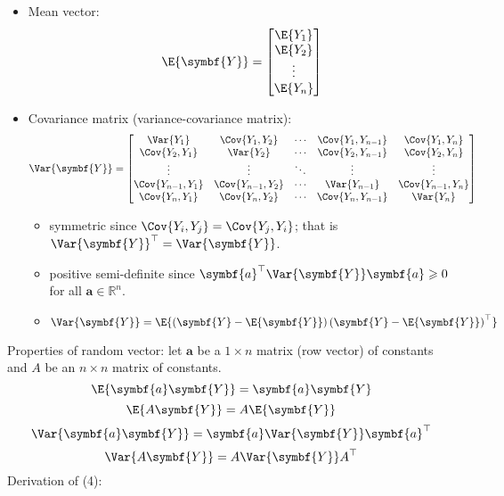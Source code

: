 \begin{itemize}
    \item Mean vector:
          \[ \E{\symbf{Y}}=\begin{bmatrix}
                  \E{Y_1} \\
                  \E{Y_2} \\
                  \vdots  \\
                  \E{Y_n}
              \end{bmatrix} \]
    \item Covariance matrix (variance-covariance matrix):
          \[ \Var{\symbf{Y}}=\begin{bmatrix}
                  \Var{Y_1}         & \Cov{Y_1,Y_2}     & \cdots & \Cov{Y_1,Y_{n-1}} & \Cov{Y_1,Y_n}     \\
                  \Cov{Y_2,Y_1}     & \Var{Y_2}         & \cdots & \Cov{Y_2,Y_{n-1}} & \Cov{Y_2,Y_n}     \\
                  \vdots            & \vdots            & \ddots & \vdots            & \vdots            \\
                  \Cov{Y_{n-1},Y_1} & \Cov{Y_{n-1},Y_2} & \cdots & \Var{Y_{n-1}}     & \Cov{Y_{n-1},Y_n} \\
                  \Cov{Y_n,Y_1}     & \Cov{Y_n,Y_2}     & \cdots & \Cov{Y_n,Y_{n-1}} & \Var{Y_n}
              \end{bmatrix} \]
          \begin{itemize}
              \item symmetric since $ \Cov{Y_i,Y_j}=\Cov{Y_j,Y_i} $; that is $ \Var{\symbf{Y}}^\top=\Var{\symbf{Y}} $.
              \item positive semi-definite since
                    $ \symbf{a}^\top\Var{\symbf{Y}}\symbf{a}\geqslant 0 $
                    for all $ \symbf{a}\in\mathbb{R}^n $.
              \item $ \Var{\symbf{Y}}=
                        \E{\left( \symbf{Y}-\E{\symbf{Y}} \right)\left( \symbf{Y}-\E{\symbf{Y}} \right)^\top} $
          \end{itemize}
\end{itemize}
Properties of random vector: let $ \symbf{a} $ be a $ 1\times n $
matrix (row vector) of constants and $ A $ be an $ n\times n $
matrix of constants.
\[ \E{\symbf{a}\symbf{Y}}=\symbf{a}\symbf{Y} \]
\[ \E{A\symbf{Y}}=A\E{\symbf{Y}} \]
\[ \Var{\symbf{a}\symbf{Y}}=\symbf{a}\Var{\symbf{Y}}\symbf{a}^\top \]
\[ \Var{A\symbf{Y}}=A\Var{\symbf{Y}}A^\top \]
Derivation of (4):
